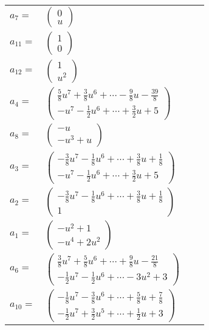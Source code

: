\documentclass[1p]{elsarticle_modified}
\theoremstyle{definition}
\begin{document}
\begin{tabular}{m{7pt} m{180pt} m{7pt} m{180pt} }
\flushright $a_{7}=$&$\begin{pmatrix}0\\u\end{pmatrix}$ \\
\flushright $a_{11}=$&$\begin{pmatrix}1\\0\end{pmatrix}$ \\
\flushright $a_{12}=$&$\begin{pmatrix}1\\u^2\end{pmatrix}$ \\
\flushright $a_{4}=$&$\begin{pmatrix}\frac{5}{8} u^7+\frac{3}{8} u^6+\cdots-\frac{9}{8} u-\frac{39}{8}\\- u^7-\frac{1}{2} u^6+\cdots+\frac{3}{2} u+5\end{pmatrix}$ \\
\flushright $a_{8}=$&$\begin{pmatrix}- u\\- u^3+u\end{pmatrix}$ \\
\flushright $a_{3}=$&$\begin{pmatrix}-\frac{3}{8} u^7-\frac{1}{8} u^6+\cdots+\frac{3}{8} u+\frac{1}{8}\\- u^7-\frac{1}{2} u^6+\cdots+\frac{3}{2} u+5\end{pmatrix}$ \\
\flushright $a_{2}=$&$\begin{pmatrix}-\frac{3}{8} u^7-\frac{1}{8} u^6+\cdots+\frac{3}{8} u+\frac{1}{8}\\1\end{pmatrix}$ \\
\flushright $a_{1}=$&$\begin{pmatrix}- u^2+1\\- u^4+2 u^2\end{pmatrix}$ \\
\flushright $a_{6}=$&$\begin{pmatrix}\frac{3}{8} u^7+\frac{5}{8} u^6+\cdots+\frac{9}{8} u-\frac{21}{8}\\-\frac{1}{2} u^7-\frac{1}{2} u^6+\cdots-3 u^2+3\end{pmatrix}$ \\
\flushright $a_{10}=$&$\begin{pmatrix}-\frac{1}{8} u^7-\frac{3}{8} u^6+\cdots+\frac{5}{8} u+\frac{7}{8}\\-\frac{1}{2} u^7+\frac{3}{2} u^5+\cdots+\frac{1}{2} u+3\end{pmatrix}$ \\

\end{tabular}
\end{document}
